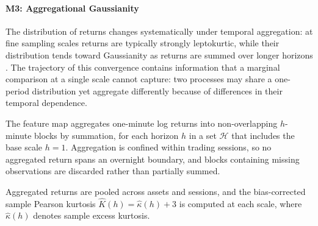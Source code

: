 \paragraph{M3: Aggregational Gaussianity}
The distribution of returns changes systematically under temporal
aggregation: at fine sampling scales returns are typically strongly
leptokurtic, while their distribution tends toward Gaussianity as returns
are summed over longer horizons \citep{cont2001empirical}.
The trajectory of this convergence contains information that a marginal
comparison at a single scale cannot capture: two processes may share a
one-period distribution yet aggregate differently because of differences
in their temporal dependence.

The feature map aggregates one-minute log returns into non-overlapping
$h$-minute blocks by summation, for each horizon $h$ in a set
$\mathcal{H}$ that includes the base scale $h=1$.
Aggregation is confined within trading sessions, so no aggregated return
spans an overnight boundary, and blocks containing missing observations
are discarded rather than partially summed.

Aggregated returns are pooled across assets and sessions, and the bias-corrected sample
Pearson kurtosis $\hat{K}(h)=\hat{\kappa}(h)+3$ is computed at each scale, where $\hat{\kappa}(h)$ denotes sample excess kurtosis.

